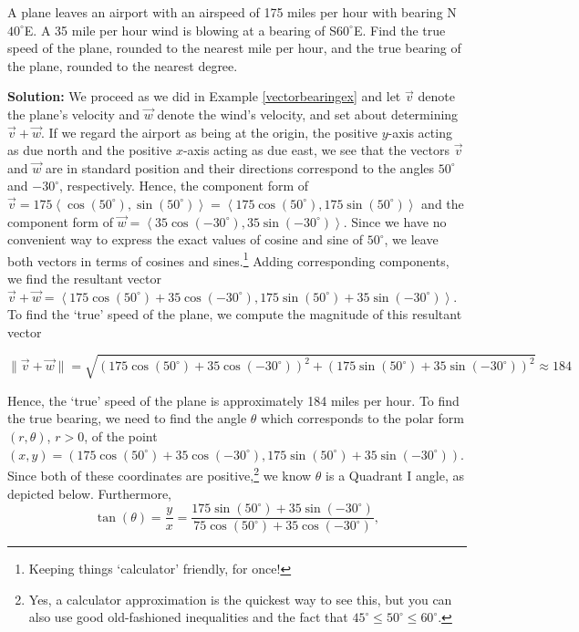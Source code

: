 \begin{ex} \label{vectorbearingexresolve}  A plane leaves an airport with an airspeed of 175 miles per hour with bearing N$40^{\circ}$E.  A 35 mile per hour wind is blowing at a bearing of S$60^{\circ}$E.  Find the true speed of the plane, rounded to the nearest mile per hour,  and the true bearing of the plane, rounded to the nearest degree.

{\bf Solution:}  We proceed as we did in Example \ref{vectorbearingex} and let $\vec{v}$ denote the plane's velocity and $\vec{w}$ denote the wind's velocity, and set about determining $\vec{v} + \vec{w}$.  If we regard the airport as being at the origin, the positive $y$-axis acting as due north and the positive $x$-axis acting as due east, we see that the vectors $\vec{v}$ and $\vec{w}$ are in standard position and their directions correspond to the angles $50^{\circ}$ and $-30^{\circ}$, respectively.  Hence, the component form of $\vec{v} = 175\left<\cos(50^{\circ}), \sin(50^{\circ})\right> = \left<175\cos(50^{\circ}), 175\sin(50^{\circ})\right>$ and the component form of $\vec{w} = \left<35\cos(-30^{\circ}), 35\sin(-30^{\circ}) \right>$.  Since we have no convenient way to express the exact values of cosine and sine of $50^{\circ}$, we leave both vectors in terms of cosines and sines.\footnote{Keeping things `calculator' friendly, for once!}  Adding corresponding components, we find the resultant vector $\vec{v} + \vec{w} = \left< 175\cos(50^{\circ}) + 35\cos(-30^{\circ}), 175\sin(50^{\circ}) + 35\sin(-30^{\circ})\right>$.  To find the `true' speed of the plane, we compute the magnitude of this resultant vector

\[ \| \vec{v} + \vec{w}\| = \sqrt{ (175\cos(50^{\circ}) + 35\cos(-30^{\circ}))^2 + (175\sin(50^{\circ}) + 35\sin(-30^{\circ}))^2} \approx 184\]

Hence, the `true' speed of the plane is approximately 184 miles per hour.  To find the true bearing, we need to find the angle $\theta$ which corresponds to the polar form $(r,\theta)$, $r>0$, of the point $(x,y) = (175\cos(50^{\circ}) + 35\cos(-30^{\circ}), 175\sin(50^{\circ}) + 35\sin(-30^{\circ}))$.  Since both of these coordinates are positive,\footnote{Yes, a calculator approximation is the quickest way to see this, but you can also use good old-fashioned inequalities and the fact that $45^{\circ} \leq 50^{\circ} \leq 60^{\circ}$.} we know $\theta$ is a Quadrant I angle, as depicted below.  Furthermore, \[\tan(\theta) = \frac{y}{x} = \frac{175\sin(50^{\circ}) + 35\sin(-30^{\circ})}{75\cos(50^{\circ}) + 35\cos(-30^{\circ})},\]


\end{ex}
